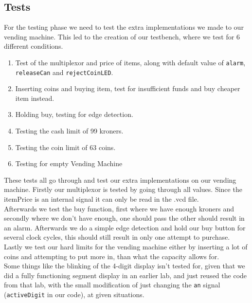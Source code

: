 \subsection{Tests}
For the testing phase we need to test the extra implementations we made to our vending machine. This led to the creation of our testbench, where we test for 6 different conditions.
\begin{enumerate}
    \item Test of the multiplexor and price of items, along with default value of \texttt{alarm}, \texttt{releaseCan} and \texttt{rejectCoinLED}.
    \item Inserting coins and buying item, test for insufficient funds and buy cheaper item instead.
    \item Holding buy, testing for edge detection.
    \item Testing the cash limit of 99 kroners.
    \item Testing the coin limit of 63 coins.
    \item Testing for empty Vending Machine
\end{enumerate}
These tests all go through and test our extra implementations on our vending machine. Firstly our multiplexor is tested by going through all values. Since the itemPrice is an internal signal it can only be read in the .vcd file. \\
Afterwards we test the buy function, first where we have enough kroners and secondly where we don't have enough, one should pass the other should result in an alarm. Afterwards we do a simple edge detection and hold our buy button for several clock cycles, this should still result in only one attempt to purchase. Lastly we test our hard limits for the vending machine either by inserting a lot of coins and attempting to put more in, than what the capacity allows for.\\
Some things like the blinking of the 4-digit display isn't tested for, given that we did a fully functioning segment display in an earlier lab, and just reused the code from that lab, with the small modification of just changing the \texttt{an} signal (\texttt{activeDigit} in our code), at given situations.\\[1in]

